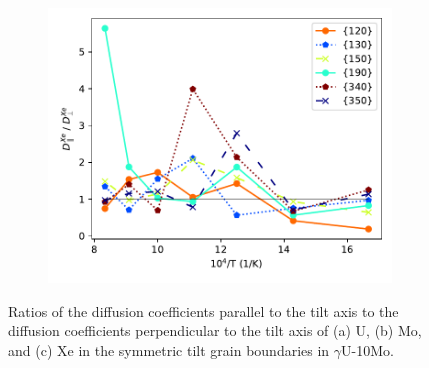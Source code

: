 \documentclass{elsarticle}
\providecommand{\DIFadd}[1]{{\protect\color{blue} \sf #1}} %
\providecommand{\DIFdel}[1]{}
\providecommand{\DIFdelbegin}{} %
\providecommand{\DIFaddFL}[1]{\DIFadd{#1}} %
\providecommand{\DIFdelFL}[1]{\DIFdel{#1}} %
\providecommand{\DIFaddbeginFL}{} %
\providecommand{\DIFaddendFL}{} %
\providecommand{\DIFdelbeginFL}{} %
\providecommand{\DIFdelendFL}{} %
\begin{document}
\begin{figure}[!ht]
\begin{subfigure}{0.49\textwidth}
    \DIFaddendFL \end{subfigure}
    \DIFdelbeginFL %
{%
\DIFdelFL{Diffusivities for U, Mo, and Xe with respect to misorientation angles for $\gamma$U-10Mo at (a) 800 K, and (b) 1200 K.}}
\DIFdelendFL \DIFaddbeginFL \begin{subfigure}{0.49\textwidth}
        \centering
        \caption{}
        \includegraphics[width=\textwidth]{ratio_Xe.pdf}
    \end{subfigure}
\caption{\DIFaddFL{Ratios of the diffusion coefficients parallel to the tilt axis to the diffusion coefficients perpendicular to the tilt axis of (a) U, (b) Mo, and (c) Xe in the symmetric tilt grain boundaries in $\gamma$U-10Mo.}}
\label{fig:ratio}
\DIFaddendFL \end{figure}

\DIFdelbegin \DIFdel{There do not appear to be any species-specific trends from the misorientation angle, as all species generally diffuse faster at higher temperatures, and tend to diffuse slightly faster with misorientation angles between 30$^{\circ}$ and 65$^{\circ}$.
For all examined misorientation angles at low temperatures, the following trend seems to be true in general:
}%
\DIFdel{However, this trend tends to break down at high temperatures where D$_{gb}^{Xe}$ becomes comparable to that for U and Mo. It can also be seen that the Xe diffusion coefficients have a larger relative variance compared to the other two species. This is expected since we only compute properties from the diffusion of 2 Xe atoms per simulation.
In contrast, we have thousands of U and Mo atoms per simulation.
}%
\end{document}
